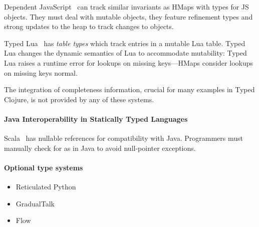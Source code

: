Dependent JavaScript~\cite{Chugh:2012:DTJ} can track similar
invariants as HMaps with types for JS objects. They must deal with
mutable objects, they feature refinement types and strong updates to
the heap to track changes to objects.

Typed Lua~\cite{Maidl:2014:TLO} has \emph{table types} which track
entries in a mutable Lua table.  Typed Lua changes the dynamic
semantics of Lua to accommodate mutability: Typed Lua raises a runtime
error for lookups on missing keys---HMaps consider lookups on missing
keys normal.

The integration of completeness information, crucial for many examples
in Typed Clojure, is not provided by any of these systems.

\paragraph{Java Interoperability in Statically Typed Languages}
Scala~\cite{OCD+} has nullable references for compatibility with Java.
Programmers must manually check for
 as in Java to avoid null-pointer exceptions. 


\paragraph{Optional type systems}
\begin{itemize}
  \item Reticulated Python~\cite{Vitousek14}
  \item GradualTalk
  \item Flow
\end{itemize}


